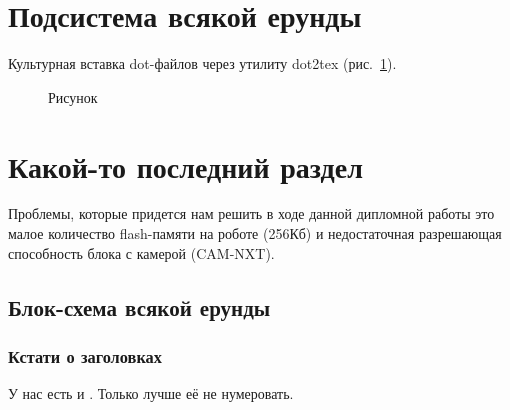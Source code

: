 \section{Подсистема всякой ерунды}

Культурная вставка dot-файлов через утилиту dot2tex (рис.~\ref{fig:fig02}).

\begin{figure}
  \centering
  \caption{Рисунок}
  \label{fig:fig02}
\end{figure}





\section{Какой-то последний раздел}
Проблемы, которые придется нам решить в ходе данной дипломной работы это малое количество flash-памяти на роботе (256Кб) и недостаточная разрешающая способность блока с камерой (CAM-NXT).



\subsection{Блок-схема всякой ерунды}

\subsubsection*{Кстати о заголовках}

У нас есть и . Только лучше её не нумеровать.


